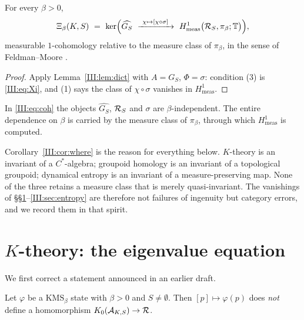 \begin{theorem}\label{III:thm:meas}
For every $\beta>0$,
\begin{equation}\label{III:eq:coh}
\Xi_\beta(K,S)\ =\ \ker\Bigl(\widehat{G_S}\ \xrightarrow{\ \chi\mapsto[\chi\circ\sigma]\ }\ H^1_{\mathrm{meas}}\bigl(\cR_S,\pi_\beta;\T\bigr)\Bigr),
\end{equation}
measurable $1$-cohomology relative to the measure class of $\pi_\beta$, in the sense of
Feldman--Moore \cite{FM}.
\end{theorem}

\begin{proof}
Apply Lemma~\ref{III:lem:dict} with $A=G_S$, $\Phi=\sigma$: condition (3) is \eqref{III:eq:Xi}, and
(1) says the class of $\chi\circ\sigma$ vanishes in $H^1_{\mathrm{meas}}$.
\end{proof}

\begin{corollary}\label{III:cor:where}
In \eqref{III:eq:coh} the objects $\widehat{G_S}$, $\mathcal{R}_S$ and $\sigma$ are $\beta$-independent.
The entire dependence on $\beta$ is carried by the measure class of $\pi_\beta$, through
which $H^1_{\mathrm{meas}}$ is computed.
\end{corollary}

\begin{remark}\label{III:rem:category}
Corollary~\ref{III:cor:where} is the reason for everything below. $K$-theory is an invariant of
a $C^*$-algebra; groupoid homology is an invariant of a topological groupoid; dynamical
entropy is an invariant of a measure-preserving map. None of the three retains a measure
class that is merely quasi-invariant. The vanishings of
\S\S\ref{III:sec:Ktheory}--\ref{III:sec:entropy} are therefore not failures of ingenuity but
category errors, and we record them in that spirit.
\end{remark}

\section{$K$-theory: the eigenvalue equation}\label{III:sec:Ktheory}

We first correct a statement announced in an earlier draft.

\begin{proposition}\label{III:prop:notrace}
Let $\varphi$ be a $\mathrm{KMS}_\beta$ state with $\beta>0$ and $S\ne\emptyset$. Then
$[p]\mapsto\varphi(p)$ does \emph{not} define a homomorphism $K_0(\mathcal{A}_{K,S})\to\mathcal{R}$.
\end{proposition}

